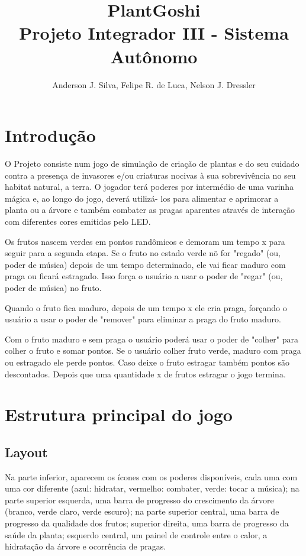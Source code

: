 \documentclass[12pt]{article}
\title{PlantGoshi\\ Projeto Integrador III - Sistema Aut\^onomo}
\author{Anderson J. Silva, Felipe R. de Luca, Nelson J. Dressler }
\begin{document}
 

\maketitle
     
\begin{resumo} 
[ ... ]
\end{resumo}

\section{Introdu\c c\~ao}

 O Projeto consiste num jogo de simula\c c\~ao de cria\c c\~ao
 de plantas e do seu cuidado contra a presen\c ca de invasores e/ou criaturas nocivas \`a sua
 sobreviv\^encia no seu habitat natural, a terra.
 O jogador ter\'a poderes por interm\'edio de uma varinha m\'agica e, ao longo do jogo, dever\'a utiliz\'a- los para alimentar e
 aprimorar a planta ou a \'arvore e tamb\'em combater as pragas aparentes atrav\'es
 de intera\c c\~ao com diferentes cores emitidas pelo LED.
 

 Os frutos nascem verdes em pontos rand\^omicos e demoram um tempo x para seguir para a segunda etapa.
 Se o fruto no estado verde n\~o for "regado" (ou, poder de música) depois de um tempo determinado,
 ele vai ficar maduro com praga ou ficar\'a estragado. Isso for\c ca o usu\'ario a usar o poder de "regar"
 (ou, poder de m\'usica) no fruto.
 
 Quando o fruto fica maduro, depois de um tempo x ele cria praga, for\c cando o usu\'ario a usar o poder
 de "remover" para eliminar a praga do fruto maduro. 
 
 Com o fruto maduro e sem praga o usu\'ario poder\'a usar o poder de  "colher" para  colher o fruto e somar pontos. 
 Se o usu\'ario colher fruto verde, maduro com praga ou estragado ele perde pontos.
 Caso deixe o fruto estragar tamb\'em pontos s\~ao descontados. Depois que uma quantidade x de frutos estragar
 o jogo termina.
 
\section{Estrutura principal do jogo}
\subsection{Layout}
Na parte inferior, aparecem os \'icones com os poderes dispon\'iveis, cada uma com uma cor diferente
(azul: hidratar, vermelho: combater, verde: tocar a m\'usica); na parte superior esquerda,
uma barra de progresso do crescimento da \'arvore (branco, verde claro, verde escuro);
na parte superior central, uma barra de progresso da qualidade dos frutos; superior direita,
uma barra de progresso da sa\'ude da planta; esquerdo central, um painel de controle entre o calor,
a hidrata\c c\~ao da \'arvore e ocorr\^encia de pragas.
\end{document}

